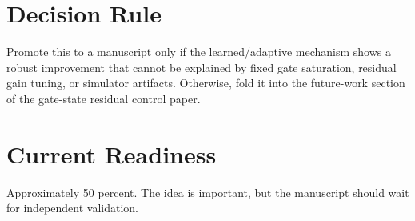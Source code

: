 \documentclass[conference]{IEEEtran}
\begin{document}
\section{Decision Rule}
Promote this to a manuscript only if the learned/adaptive mechanism shows a robust improvement that cannot be explained by fixed gate saturation, residual gain tuning, or simulator artifacts. Otherwise, fold it into the future-work section of the gate-state residual control paper.

\section{Current Readiness}
Approximately 50 percent. The idea is important, but the manuscript should wait for independent validation.
\end{document}
